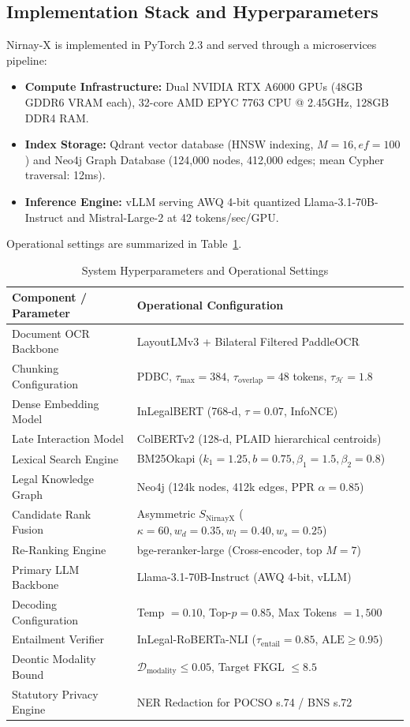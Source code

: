 \documentclass[conference]{IEEEtran}
\begin{document}
\subsection{Implementation Stack and Hyperparameters}
Nirnay-X is implemented in PyTorch 2.3 and served through a microservices pipeline:
\begin{itemize}
    \item \textbf{Compute Infrastructure:} Dual NVIDIA RTX A6000 GPUs (48GB GDDR6 VRAM each), 32-core AMD EPYC 7763 CPU @ 2.45GHz, 128GB DDR4 RAM.
    \item \textbf{Index Storage:} Qdrant vector database (HNSW indexing, $M=16, ef=100$) and Neo4j Graph Database (124,000 nodes, 412,000 edges; mean Cypher traversal: 12ms).
    \item \textbf{Inference Engine:} vLLM serving AWQ 4-bit quantized Llama-3.1-70B-Instruct and Mistral-Large-2 at 42 tokens/sec/GPU.
\end{itemize}

Operational settings are summarized in Table~\ref{tab:hyperparameters}.

\begin{table}[!t]
\caption{System Hyperparameters and Operational Settings}
\label{tab:hyperparameters}
\centering
\footnotesize
\setlength{\tabcolsep}{4pt}
\begin{tabularx}{\columnwidth}{l>{\raggedright\arraybackslash}X}
\toprule
\textbf{Component / Parameter} & \textbf{Operational Configuration} \\
\midrule
Document OCR Backbone & LayoutLMv3 + Bilateral Filtered PaddleOCR \\
Chunking Configuration & PDBC, $\tau_{\max}=384$, $\tau_{\text{overlap}}=48$ tokens, $\tau_{\mathcal{H}}=1.8$ \\
Dense Embedding Model & InLegalBERT (768-d, $\tau=0.07$, InfoNCE) \\
Late Interaction Model & ColBERTv2 (128-d, PLAID hierarchical centroids) \\
Lexical Search Engine & BM25Okapi ($k_1=1.25, b=0.75, \beta_1=1.5, \beta_2=0.8$) \\
Legal Knowledge Graph & Neo4j (124k nodes, 412k edges, PPR $\alpha=0.85$) \\
Candidate Rank Fusion & Asymmetric $S_{\text{NirnayX}}$ ($\kappa=60, w_{d}=0.35, w_{l}=0.40, w_{s}=0.25$) \\
Re-Ranking Engine & bge-reranker-large (Cross-encoder, top $M=7$) \\
Primary LLM Backbone & Llama-3.1-70B-Instruct (AWQ 4-bit, vLLM) \\
Decoding Configuration & Temp $=0.10$, Top-$p=0.85$, Max Tokens $=1,500$ \\
Entailment Verifier & InLegal-RoBERTa-NLI ($\tau_{\text{entail}}=0.85$, $\text{ALE}\ge 0.95$) \\
Deontic Modality Bound & $\mathcal{D}_{\text{modality}} \le 0.05$, Target FKGL $\le 8.5$ \\
Statutory Privacy Engine & NER Redaction for POCSO s.74 / BNS s.72~\cite{dpdpa2023} \\
\bottomrule
\end{tabularx}
\end{table}
\end{document}
